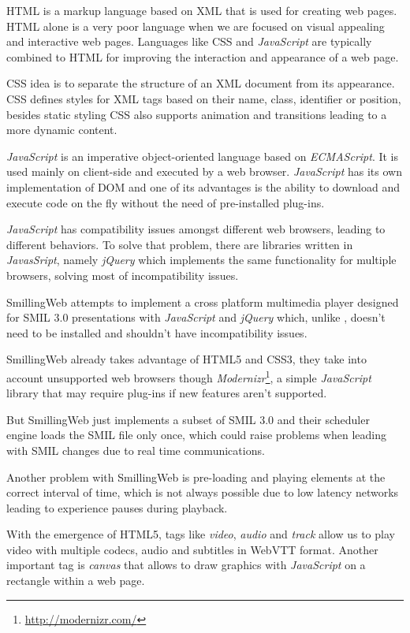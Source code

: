   \ac{HTML} is a markup language based on \ac{XML} that is used for creating web pages. \ac{HTML} alone is a very poor language when we are focused on visual appealing and interactive web pages. Languages like \ac{CSS} and \textit{JavaScript} are typically combined to \ac{HTML} for improving the interaction and appearance of a web page. 

  \ac{CSS} idea is to separate the structure of an \ac{XML} document from its appearance. \ac{CSS} defines styles for \ac{XML} tags based on their name, class, identifier or position, besides static styling \ac{CSS} also supports animation and transitions leading to a more dynamic content.

  \textit{JavaScript} is an imperative object-oriented language based on \textit{ECMAScript}. It is used mainly on client-side and executed by a web browser. \textit{JavaScript} has its own implementation of \ac{DOM} and one of its advantages is the ability to download and execute code on the fly without the need of pre-installed plug-ins.

  \textit{JavaScript} has compatibility issues amongst different web browsers, leading to different behaviors. To solve that problem, there are libraries written in \textit{JavasSript}, namely \textit{jQuery} which implements the same functionality for multiple browsers, solving most of incompatibility issues.

  SmillingWeb \cite{smillingweb} attempts to implement a cross platform multimedia player designed for \ac{SMIL} 3.0 presentations with \textit{JavaScript} and \textit{jQuery} which, unlike \cite{ambulant}, doesn't need to be installed and shouldn't have incompatibility issues. 

  SmillingWeb already takes advantage of \ac{HTML}5 and \ac{CSS}3, they take into account unsupported web browsers though \textit{Modernizr}\footnote{\url{http://modernizr.com/}}, a simple \textit{JavaScript} library that may require plug-ins if new features aren't supported.  

  But SmillingWeb just implements a subset of \ac{SMIL} 3.0 and their scheduler engine loads the \ac{SMIL} file only once, which could raise problems when leading with \ac{SMIL} changes due to real time communications.

  Another problem with SmillingWeb is pre-loading and playing elements at the correct interval of time, which is not always possible due to low latency networks leading to experience pauses during playback.

  With the emergence of \ac{HTML}5, tags like \textit{video}, \textit{audio} and \textit{track} allow us to play video with multiple codecs, audio and subtitles in \ac{WebVTT} format. Another important tag is \textit{canvas} that allows to draw graphics with \textit{JavaScript} on a rectangle within a web page.

